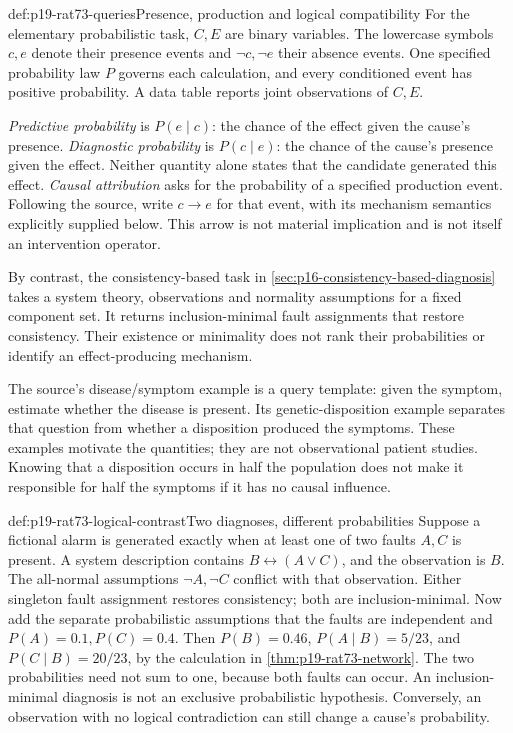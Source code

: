 \begin{hbdefinition}{def:p19-rat73-queries}{Presence, production and logical compatibility}
For the elementary probabilistic task, \(C,E\) are binary variables.
The lowercase symbols \(c,e\) denote their presence events and
\(\neg c,\neg e\) their absence events. One specified probability law
\(P\) governs each calculation, and every conditioned event has positive
probability. A data table reports joint observations of \(C,E\).

\emph{Predictive probability} is \(P(e\mid c)\): the chance of the effect
given the cause's presence. \emph{Diagnostic probability} is
\(P(c\mid e)\): the chance of the cause's presence given the effect.
Neither quantity alone states that the candidate generated this effect.
\emph{Causal attribution} asks for the probability of a specified production
event. Following the source, write \(c\to e\) for that event, with its
mechanism semantics explicitly supplied below. This arrow is not material
implication and is not itself an intervention operator.

By contrast, the consistency-based task in
\cref{sec:p16-consistency-based-diagnosis} takes a system theory,
observations and normality assumptions for a fixed component set. It
returns inclusion-minimal fault assignments that restore consistency.
Their existence or minimality does not rank their probabilities or identify
an effect-producing mechanism.
\end{hbdefinition}

The source's disease/symptom example is a query template: given the symptom,
estimate whether the disease is present. Its genetic-disposition example
separates that question from whether a disposition produced the symptoms.
These examples motivate the quantities; they are not observational patient
studies. Knowing that a disposition occurs in half the population does not
make it responsible for half the symptoms if it has no causal influence.
\cite[secs.~1--3, pp.~449--452]{MederMayrhofer2021DiagnosticCausal}

\begin{hbexample}{def:p19-rat73-logical-contrast}{Two diagnoses, different probabilities}
Suppose a fictional alarm is generated exactly when at least one of two
faults \(A,C\) is present. A system description contains
\(B\leftrightarrow(A\lor C)\), and the observation is \(B\).
The all-normal assumptions \(\neg A,\neg C\) conflict with that observation.
Either singleton fault assignment restores consistency; both are
inclusion-minimal. Now add the separate probabilistic assumptions that
the faults are independent and \(P(A)=0.1,P(C)=0.4\).
Then \(P(B)=0.46\), \(P(A\mid B)=5/23\), and
\(P(C\mid B)=20/23\), by the calculation in
\cref{thm:p19-rat73-network}. The two probabilities need not sum to one,
because both faults can occur. An inclusion-minimal diagnosis is not an
exclusive probabilistic hypothesis. Conversely, an observation with no
logical contradiction can still change a cause's probability.
\end{hbexample}

